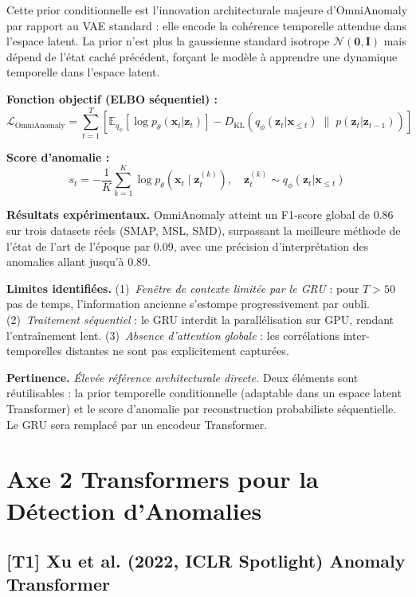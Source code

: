 \documentclass[12pt,a4paper]{article}
\begin{document}
Cette prior conditionnelle est l'innovation architecturale majeure d'OmniAnomaly par rapport au VAE standard : elle encode la cohérence temporelle attendue dans l'espace latent. La prior n'est plus la gaussienne standard isotrope $\mathcal{N}(\mathbf{0},\mathbf{I})$ mais dépend de l'état caché précédent, forçant le modèle à apprendre une dynamique temporelle dans l'espace latent.

\textbf{Fonction objectif (ELBO séquentiel) :}
$$\mathcal{L}_{\mathrm{OmniAnomaly}} = \sum_{t=1}^T\!\left[\mathbb{E}_{q_\phi}\!\left[\log p_\theta(\mathbf{x}_t|\mathbf{z}_t)\right] - D_{\mathrm{KL}}\!\left(q_\phi(\mathbf{z}_t|\mathbf{x}_{\leq t})\;\|\;p(\mathbf{z}_t|\mathbf{z}_{t-1})\right)\right]$$

\textbf{Score d'anomalie :}
$$s_t = -\frac{1}{K}\sum_{k=1}^K\log p_\theta\!\left(\mathbf{x}_t\mid\mathbf{z}_t^{(k)}\right), \quad \mathbf{z}_t^{(k)} \sim q_\phi(\mathbf{z}_t|\mathbf{x}_{\leq t})$$

\textbf{Résultats expérimentaux.} OmniAnomaly atteint un F1-score global de 0.86 sur trois datasets réels (SMAP, MSL, SMD), surpassant la meilleure méthode de l'état de l'art de l'époque par 0.09, avec une précision d'interprétation des anomalies allant jusqu'à 0.89.

\textbf{Limites identifiées.} (1)~\textit{Fenêtre de contexte limitée par le GRU} : pour $T > 50$ pas de temps, l'information ancienne s'estompe progressivement par oubli. (2)~\textit{Traitement séquentiel} : le GRU interdit la parallélisation sur GPU, rendant l'entraînement lent. (3)~\textit{Absence d'attention globale} : les corrélations inter-temporelles distantes ne sont pas explicitement capturées.

\textbf{Pertinence.} \textit{Élevée  référence architecturale directe.} Deux éléments sont réutilisables : la prior temporelle conditionnelle (adaptable dans un espace latent Transformer) et le score d'anomalie par reconstruction probabiliste séquentielle. Le GRU sera remplacé par un encodeur Transformer.

\section{Axe 2 Transformers pour la Détection d'Anomalies}

\subsection{[T1] Xu et al. (2022, ICLR Spotlight)  Anomaly Transformer}
\end{document}
